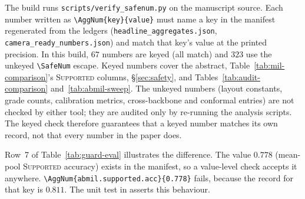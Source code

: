\documentclass{article}
\newcommand{\SafeNum}[1]{#1}
\newcommand{\AggNum}[2]{#2}
\begin{document}
The build runs \texttt{scripts/verify\_safenum.py} on the manuscript source. Each number written as \texttt{\textbackslash AggNum\{key\}\{value\}} must name a key in the manifest regenerated from the ledgers (\texttt{headline\_aggregates.json}, \texttt{camera\_ready\_numbers.json}) and match that key's value at the printed precision. In this build, $\SafeNum{67}$ numbers are keyed (all match) and $\SafeNum{323}$ use the unkeyed \texttt{\textbackslash SafeNum} escape. Keyed numbers cover the abstract, Table~\ref{tab:mil-comparison}'s \textsc{Supported} columns, \S\ref{sec:safety}, and Tables~\ref{tab:audit-comparison} and~\ref{tab:abmil-sweep}. The unkeyed numbers (layout constants, grade counts, calibration metrics, cross-backbone and conformal entries) are not checked by either tool; they are audited only by re-running the analysis scripts. The keyed check therefore guarantees that a keyed number matches its own record, not that every number in the paper does.

Row~7 of Table~\ref{tab:guard-eval} illustrates the difference. The value $\SafeNum{0.778}$ (mean-pool \textsc{Supported} accuracy) exists in the manifest, so a value-level check accepts it anywhere. \texttt{\textbackslash AggNum\{abmil.supported.acc\}\{0.778\}} fails, because the record for that key is $\AggNum{abmil.supported.acc}{0.811}$. The unit test  in  asserts this behaviour.
\end{document}
